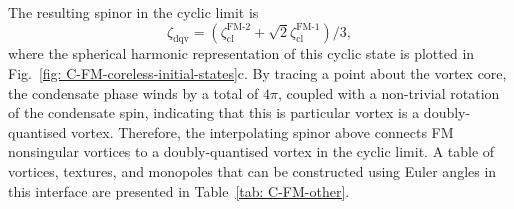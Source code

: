 The resulting spinor in the cyclic limit is
\begin{equation}\label{eq: C-FM-DQV-cyclic-limit}
    \zeta_\text{dqv}
    = \left(\zeta^\text{FM-2}_\text{cl}
    + \sqrt{2}\zeta^\text{FM-1}_\text{cl}\right) / 3,
\end{equation}
where the spherical harmonic representation of this cyclic state is plotted in
Fig.~\ref{fig: C-FM-coreless-initial-states}c.
By tracing a point about the vortex core, the condensate phase winds by a total
of \(4\pi \), coupled with a non-trivial rotation of the condensate spin,
indicating that this is particular vortex is a doubly-quantised vortex.
Therefore, the interpolating spinor above connects FM nonsingular vortices to a
doubly-quantised vortex in the cyclic limit.
A table of vortices, textures, and monopoles that can be constructed using
Euler angles in this interface are presented in Table~\ref{tab: C-FM-other}.
